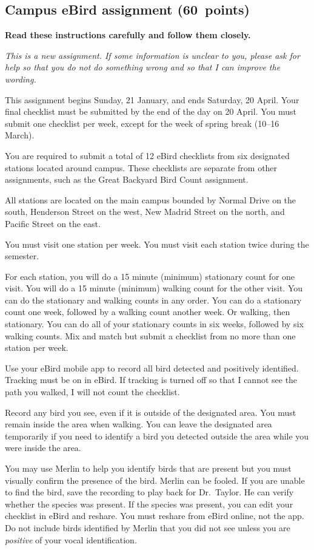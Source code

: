 \documentclass[12pt]{article}
\begin{document}
\thispagestyle{plain}

\subsection*{Campus eBird assignment (60\ points)}

\textbf{Read these instructions carefully and follow them closely.}

\textit{This is a new assignment. If some information is unclear to you, please ask for help so that you do not do something wrong and so that I can improve the wording.}

This assignment begins Sunday, 21 January, and ends Saturday, 20 April. Your final checklist must be submitted by the end of the day on 20 April. You must submit one checklist per week, except for the week of spring break (10–16 March).

You are required to submit a total of 12 eBird checklists from six designated stations located around campus. These checklists are separate from other assignments, such as the Great Backyard Bird Count assignment.

All stations are located on the main campus bounded by Normal Drive on the south, Henderson Street on the west, New Madrid Street on the north, and Pacific Street on the east. 

You must visit one station per week. You must visit each station twice during the semester.

For each station, you will do a 15 minute (minimum) stationary count for one visit. You will do a 15 minute (minimum) walking count for the other visit. You can do the stationary and walking counts in any order. You can do a stationary count one week, followed by a walking count another week. Or walking, then stationary. You can do all of your stationary counts in six weeks, followed by six walking counts. Mix and match but submit a checklist from no more than one station per week.

Use your eBird mobile app to record all bird detected and positively identified. Tracking must be on in eBird. If tracking is turned off so that I cannot see the path you walked, I will not count the checklist.

Record any bird you see, even if it is outside of the designated area. You must remain inside the area when walking. You can leave the designated area temporarily if you need to identify a bird you detected outside the area while you were inside the area. 

You may use Merlin to help you identify birds that are present but you must visually confirm the presence of the bird. Merlin can be fooled. If you are unable to find the bird, save the recording to play back for Dr.~Taylor. He can verify whether the species was present.  If the species was present, you can edit your checklist in eBird and reshare. You must reshare from eBird online, not the app. Do not include birds identified by Merlin that you did not see unless you are \textit{positive} of your vocal identification.
\end{document}
